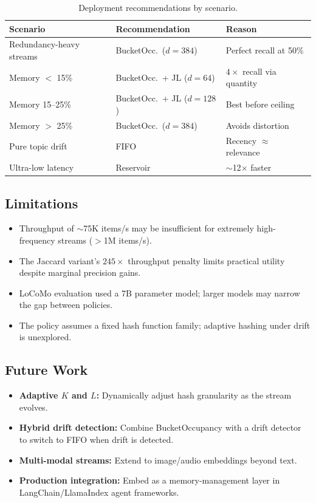 \documentclass[conference]{IEEEtran}
\begin{document}
\begin{table}[h]
\centering
\caption{Deployment recommendations by scenario.}
\label{tab:deploy}
\begin{tabular}{@{}lll@{}}
\toprule
Scenario & Recommendation & Reason \\
\midrule
Redundancy-heavy streams & BucketOcc.\ ($d{=}384$) & Perfect recall at 50\% \\
Memory $<$ 15\% & BucketOcc.\ + JL ($d{=}64$) & $4\times$ recall via quantity \\
Memory 15--25\% & BucketOcc.\ + JL ($d{=}128$) & Best before ceiling \\
Memory $>$ 25\% & BucketOcc.\ ($d{=}384$) & Avoids distortion \\
Pure topic drift & FIFO & Recency $\approx$ relevance \\
Ultra-low latency & Reservoir & $\sim$12$\times$ faster \\
\bottomrule
\end{tabular}
\end{table}

\subsection{Limitations}
\begin{itemize}
\item Throughput of $\sim$75K items/s may be insufficient for extremely
      high-frequency streams ($>$1M items/s).
\item The Jaccard variant's $245\times$ throughput penalty limits
      practical utility despite marginal precision gains.
\item LoCoMo evaluation used a 7B parameter model; larger models may
      narrow the gap between policies.
\item The policy assumes a fixed hash function family; adaptive hashing
      under drift is unexplored.
\end{itemize}

\subsection{Future Work}
\begin{itemize}
\item \textbf{Adaptive $K$ and $L$:} Dynamically adjust hash
      granularity as the stream evolves.
\item \textbf{Hybrid drift detection:} Combine BucketOccupancy with a
      drift detector to switch to FIFO when drift is detected.
\item \textbf{Multi-modal streams:} Extend to image/audio embeddings
      beyond text.
\item \textbf{Production integration:} Embed as a memory-management
      layer in LangChain/LlamaIndex agent frameworks.
\end{itemize}
\end{document}
